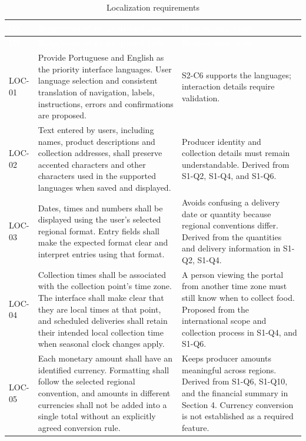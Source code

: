 \documentclass[11pt,a4paper]{article}
\begin{document}
{\footnotesize
\begin{longtable}{>{\raggedright\arraybackslash\hspace{0pt}}p{}>{\raggedright\arraybackslash\hspace{0pt}}p{}>{\raggedright\arraybackslash\hspace{0pt}}p{}}
\caption{Localization requirements}\\
\rowcolor{hdr}\textcolor{white}{\textbf{ID}} & \textcolor{white}{\textbf{Requirement or proposed rule}} & \textcolor{white}{\textbf{Reason and basis}} \\ \endfirsthead
\rowcolor{hdr}\textcolor{white}{\textbf{ID}} & \textcolor{white}{\textbf{Requirement or proposed rule}} & \textcolor{white}{\textbf{Reason and basis}} \\ \endhead
LOC-01 & Provide Portuguese and English as the priority interface languages. User language selection and consistent translation of navigation, labels, instructions, errors and confirmations are proposed. & S2-C6 supports the languages; interaction details require validation. \\ \hline
LOC-02 & Text entered by users, including names, product descriptions and collection addresses, shall preserve accented characters and other characters used in the supported languages when saved and displayed. & Producer identity and collection details must remain understandable. Derived from S1-Q2, S1-Q4, and S1-Q6. \\ \hline
LOC-03 & Dates, times and numbers shall be displayed using the user's selected regional format. Entry fields shall make the expected format clear and interpret entries using that format. & Avoids confusing a delivery date or quantity because regional conventions differ. Derived from the quantities and delivery information in S1-Q2, S1-Q4. \\ \hline
LOC-04 & Collection times shall be associated with the collection point's time zone. The interface shall make clear that they are local times at that point, and scheduled deliveries shall retain their intended local collection time when seasonal clock changes apply. & A person viewing the portal from another time zone must still know when to collect food. Proposed from the international scope and collection process in S1-Q4, and S1-Q6. \\ \hline
LOC-05 & Each monetary amount shall have an identified currency. Formatting shall follow the selected regional convention, and amounts in different currencies shall not be added into a single total without an explicitly agreed conversion rule. & Keeps producer amounts meaningful across regions. Derived from S1-Q6, S1-Q10, and the financial summary in Section 4. Currency conversion is not established as a required feature. \\ \hline

\end{longtable}}
\end{document}
